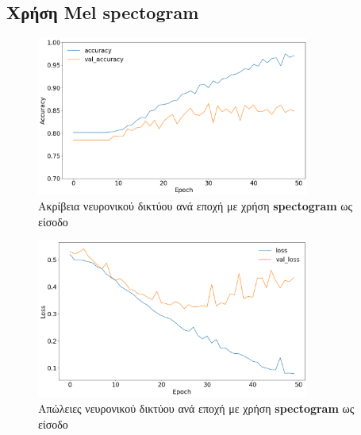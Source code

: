 \documentclass[../main.tex]{subfiles}
\begin{document}
\subsection{Χρήση Mel spectogram}
\begin{figure}[H]
	\center
	\includegraphics[width=0.8\textwidth]{../images/accuracy_spectogram.png}
	\caption{Ακρίβεια νευρονικού δικτύου ανά εποχή με χρήση \textbf{spectogram} ως
		είσοδο}
	\label{accuracy_spectogram}
\end{figure}
\begin{figure}[H]
	\center
	\includegraphics[width=0.8\textwidth]{../images/loss_spectogram.png}
	\caption{Απώλειες νευρονικού δικτύου ανά εποχή με χρήση \textbf{spectogram} ως
		είσοδο}
	\label{loss_spectogram}
\end{figure}
\end{document}
